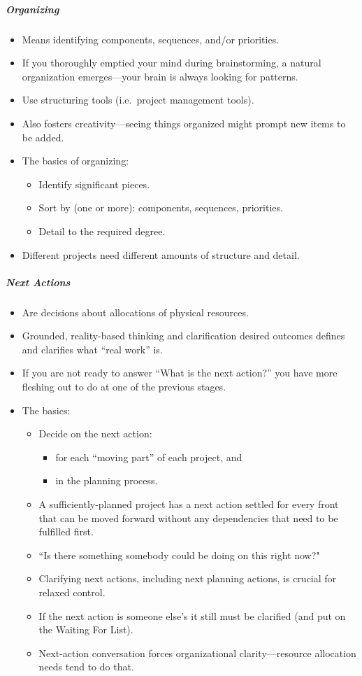 \documentclass{article}
\begin{document}
\subparagraph{Organizing}

\begin{itemize}
  \item Means identifying components, sequences, and/or priorities.
  \item If you thoroughly emptied your mind during brainstorming, a natural organization emerges---your brain is always looking for patterns.
  \item Use structuring tools (i.e.\ project management tools).
  \item Also fosters creativity---seeing things organized might prompt new items to be added.
  \item The basics of organizing:
  \begin{itemize}
    \item Identify significant pieces.
    \item Sort by (one or more): components, sequences, priorities.
    \item Detail to the required degree.
  \end{itemize}
  \item Different projects need different amounts of structure and detail.
\end{itemize}

\subparagraph{Next Actions}

\begin{itemize}
  \item Are decisions about allocations of physical resources.
  \item Grounded, reality-based thinking and clarification desired outcomes defines and clarifies what ``real work'' is.
  \item If you are not ready to answer ``What is the next action?'' you have more fleshing out to do at one of the previous stages.
  \item The basics:
  \begin{itemize}
    \item Decide on the next action:
    \begin{itemize}
      \item for each ``moving part'' of each project, and
      \item in the planning process.
    \end{itemize}
    \item A sufficiently-planned project has a next action settled for every front that can be moved forward without any dependencies that need to be fulfilled first.
    \item ``Is there something somebody could be doing on this right now?"
    \item Clarifying next actions, including next planning actions, is crucial for relaxed control.
    \item If the next action is someone else's it still must be clarified (and put on the Waiting For List).
    \item Next-action conversation forces organizational clarity---resource allocation needs tend to do that.
  \end{itemize}
\end{itemize}
\end{document}
